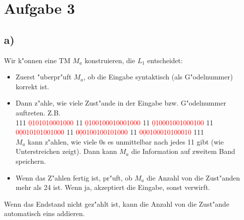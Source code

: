 \documentclass[a4paper,11pt]{scrartcl}
\begin{document}
\section*{Aufgabe 3}

\subsection*{a)}

Wir k"onnen eine TM $M_a$ konstruieren, die $L_1$ entscheidet:\\
\begin{itemize}
	\item Zuerst "uberpr"uft $M_a$, ob die Eingabe syntaktisch (als G"odelnummer) korrekt ist.
	\item Dann z"ahle, wie viele Zust"ande in der Eingabe bzw. G"odelnummer auftreten. Z.B. \\
	111 \textcolor{red}{$\underline{0}$101010001000} 11 \textcolor{red}{$\underline{0}$100100010001000} 11 \textcolor{red}{$\underline{0}$10001001000100} 11
\\
	\textcolor{red}{$\underline{000}$10101001000} 11 \textcolor{red}{$\underline{000}$100100101000} 11 \textcolor{red}{$\underline{000}$100010100010} 111 \\ 
	$M_a$ kann z"ahlen, wie viele 0s es unmittelbar nach jedes 11 gibt (wie Unterstreichen zeigt). Dann kann $M_a$ die Information auf zweitem Band speichern.
	\item Wenn das Z"ahlen fertig ist, pr"uft, ob $M_a$ die Anzahl von die Zust"anden mehr als 24 ist. Wenn ja, akzeptiert die Eingabe, sonst verwirft.
\end{itemize}
Wenn das Endstand nicht gez"ahlt ist, kann die Anzahl von die Zust"ande automatisch eins addieren. 
\end{document}
